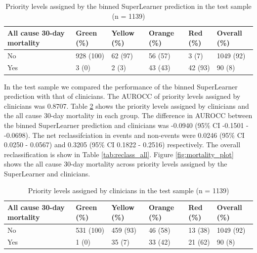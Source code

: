 \documentclass[10pt,letterpaper]{article}\usepackage[]{graphicx}\usepackage[]{color}
\begin{document}
\begin{table}[ht]
\centering
\caption{Priority levels assigned by the binned SuperLearner prediction in the test sample (n = 1139)} 
\label{tab:superlearner_priorities_test}
\begin{tabular}{llllll}
  \hline
All cause 30-day mortality & Green (\%) & Yellow (\%) & Orange (\%) & Red (\%) & Overall (\%) \\ 
  \hline
No & 928 (100) & 62 (97) & 56 (57) & 3 (7) & 1049 (92) \\ 
  Yes & 3 (0) & 2 (3) & 43 (43) & 42 (93) & 90 (8) \\ 
   \hline
\end{tabular}
\end{table}


In the test sample we compared the performance of the binned SuperLearner
prediction with that of clinicians. The AUROCC of priority levels assigned by
clinicians was 0.8707. Table \ref{tab:clinicians_priorities_test}
shows the priority levels assigned by clinicians and the all cause 30-day
mortality in each group. The difference in AUROCC between the binned
SuperLearner prediction and clinicians was
-0.0940 (95\% CI -0.1501 - -0.0698). The net reclassifciation in events and
non-events were 0.0246 (95\% CI 0.0250 - 0.0567) and 0.3205 (95\% CI 0.1822 - 0.2516) respectively. The overall
reclassification is show in Table \ref{tab:reclass_all}. Figure
\ref{fig:mortality_plot} shows the all cause 30-day mortality across priority
levels assigned by the SuperLearner and clinicians.

\begin{table}[ht]
\centering
\caption{Priority levels assigned by clinicians in the test sample (n = 1139)} 
\label{tab:clinicians_priorities_test}
\begin{tabular}{llllll}
  \hline
All cause 30-day mortality & Green (\%) & Yellow (\%) & Orange (\%) & Red (\%) & Overall (\%) \\ 
  \hline
No & 531 (100) & 459 (93) & 46 (58) & 13 (38) & 1049 (92) \\ 
  Yes & 1 (0) & 35 (7) & 33 (42) & 21 (62) & 90 (8) \\ 
   \hline
\end{tabular}
\end{table}
\end{document}
